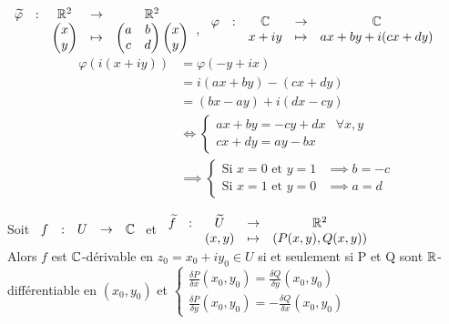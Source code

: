 \documentclass[]{report}
\begin{document}
\begin{re}[Calcul] $\begin{array}{ccccc}
\widetilde{\varphi} & : & \mathbb{R}^2 & \to & \mathbb{R}^2 \\
 & & \begin{pmatrix}
x \\
y
\end{pmatrix} & \mapsto & \begin{pmatrix}
a & b \\
c & d 
\end{pmatrix}\begin{pmatrix}
x \\
y 
\end{pmatrix} \\
\end{array}$, $\begin{array}{ccccc}
\varphi & : & \mathbb{C} & \to & \mathbb{C} \\
 & & x+iy & \mapsto & ax+by+i(cx+dy) \\
\end{array}$\\
\begin{align*}
\varphi(i(x+iy)) & =\varphi(-y+ix)\\ 
&=i(ax+by)-(cx+dy) \\
&=(bx-ay)+i(dx-cy) \\
& \iff \begin{cases} ax+by=-cy+dx & \forall x,y\\ cx+dy=ay-bx \end{cases} \\
& \implies \begin{cases} \text{Si } x=0 \text{ et } y=1  & \implies b=-c \\ \text{Si } x=1 \text{ et } y=0  & \implies a=d  \end{cases}
\end{align*}
\end{re}

\begin{prop}
    Soit $\begin{array}{ccccc}f & : & U & \to & \mathbb{C}\end{array}$ et $\begin{array}{ccccc}
\widetilde{f} & : & \widetilde{U} & \to & \mathbb{R}^2 \\
 & & (x,y) & \mapsto & (P(x,y),Q(x,y)) \\ 
\end{array}$ \\
Alors $f$ est $\mathbb{C}$-dérivable en $z_0=x_0+iy_0 \in U$ si et seulement si P et Q sont $\mathbb{R}$-différentiable en $(x_0,y_0)$ et $\begin{cases} \frac{\delta P}{\delta x}(x_0,y_0)=\frac{\delta Q}{\delta y}(x_0,y_0)\\ \frac{\delta P}{\delta y}(x_0,y_0)=-\frac{\delta Q}{\delta x}(x_0,y_0) \end{cases}$
\end{prop}
\end{document}
